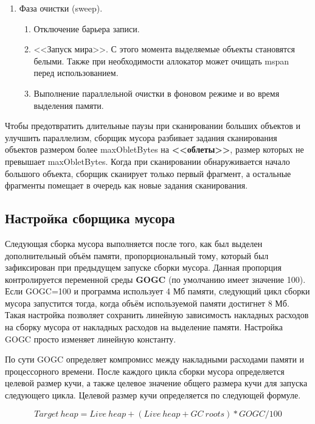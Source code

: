 \begin{enumerate}[label*=\arabic*.]
	\item Фаза очистки (sweep).
	\begin{enumerate}[label*=\arabic*.]
		\item Отключение барьера записи.
		\item <<Запуск мира>>. С этого момента выделяемые объекты становятся белыми. Также при необходимости аллокатор может очищать mspan перед использованием.
		\item Выполнение параллельной очистки в фоновом режиме и во время выделения памяти.
	\end{enumerate}
\end{enumerate}

Чтобы предотвратить длительные паузы при сканировании больших объектов и улучшить параллелизм, сборщик мусора разбивает задания сканирования объектов размером более maxObletBytes на \textbf{<<облеты>>}, размер которых не превышает maxObletBytes. Когда при сканировании обнаруживается начало большого объекта, сборщик сканирует только первый фрагмент, а остальные фрагменты помещает в очередь как новые задания сканирования. \cite{golang_gc}



\subsection{Настройка сборщика мусора}

Следующая сборка мусора выполняется после того, как был выделен дополнительный объём памяти, пропорциональный тому, который был зафиксирован при предыдущем запуске сборки мусора. Данная пропорция контролируется переменной среды \textbf{GOGC} (по умолчанию  имеет значение 100). Если GOGC=100 и программа использует 4 Мб памяти, следующий цикл сборки мусора запустится тогда, когда объём используемой памяти достигнет 8 Мб. Такая настройка позволяет сохранить линейную зависимость накладных расходов на сборку мусора от накладных расходов на выделение памяти. Настройка GOGC просто изменяет линейную константу. \cite{golang_gc}

По сути GOGC определяет компромисс между накладными расходами памяти и процессорного времени. После каждого цикла сборки мусора определяется целевой размер кучи, а также целевое значение общего размера кучи для запуска следующего цикла. Целевой размер кучи определяется по следующей формуле. \cite{golang_gc_guide}

\begin{equation}
	Target\ heap = Live\ heap + (Live\ heap + GC\ roots) * GOGC / 100
\end{equation}

